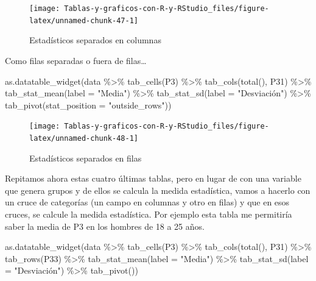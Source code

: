 \documentclass[
]{book}
\newenvironment{Shaded}{\begin{snugshade}}{\end{snugshade}}
\newcommand{\AttributeTok}[1]{\textcolor[rgb]{0.77,0.63,0.00}{#1}}
\newcommand{\FunctionTok}[1]{\textcolor[rgb]{0.00,0.00,0.00}{#1}}
\newcommand{\NormalTok}[1]{#1}
\newcommand{\SpecialCharTok}[1]{\textcolor[rgb]{0.00,0.00,0.00}{#1}}
\newcommand{\StringTok}[1]{\textcolor[rgb]{0.31,0.60,0.02}{#1}}
\begin{document}
\begin{figure}[H]

{\centering \texttt{[image: Tablas-y-graficos-con-R-y-RStudio\_files/figure-latex/unnamed-chunk-47-1]} 

}

\caption{Estadísticos separados en columnas}\label{fig:unnamed-chunk-47}
\end{figure}

Como filas separadas o fuera de filas\ldots{}

\begin{Shaded}
\begin{Highlighting}[]
\FunctionTok{as.datatable\_widget}\NormalTok{(data }\SpecialCharTok{\%\textgreater{}\%}
  \FunctionTok{tab\_cells}\NormalTok{(P3) }\SpecialCharTok{\%\textgreater{}\%}
  \FunctionTok{tab\_cols}\NormalTok{(}\FunctionTok{total}\NormalTok{(), P31) }\SpecialCharTok{\%\textgreater{}\%}
  \FunctionTok{tab\_stat\_mean}\NormalTok{(}\AttributeTok{label =} \StringTok{"Media"}\NormalTok{) }\SpecialCharTok{\%\textgreater{}\%}
  \FunctionTok{tab\_stat\_sd}\NormalTok{(}\AttributeTok{label =} \StringTok{"Desviación"}\NormalTok{) }\SpecialCharTok{\%\textgreater{}\%}
  \FunctionTok{tab\_pivot}\NormalTok{(}\AttributeTok{stat\_position =} \StringTok{"outside\_rows"}\NormalTok{))}
\end{Highlighting}
\end{Shaded}

\begin{figure}[H]

{\centering \texttt{[image: Tablas-y-graficos-con-R-y-RStudio\_files/figure-latex/unnamed-chunk-48-1]} 

}

\caption{Estadísticos separados en filas}\label{fig:unnamed-chunk-48}
\end{figure}

Repitamos ahora estas cuatro últimas tablas, pero en lugar de con una variable que genera grupos y de ellos se calcula la medida estadística, vamos a hacerlo con un cruce de categorías (un campo en columnas y otro en filas) y que en esos cruces, se calcule la medida estadística. Por ejemplo esta tabla me permitiría saber la media de P3 en los hombres de 18 a 25 años.

\begin{Shaded}
\begin{Highlighting}[]
\FunctionTok{as.datatable\_widget}\NormalTok{(data }\SpecialCharTok{\%\textgreater{}\%}
  \FunctionTok{tab\_cells}\NormalTok{(P3) }\SpecialCharTok{\%\textgreater{}\%}
  \FunctionTok{tab\_cols}\NormalTok{(}\FunctionTok{total}\NormalTok{(), P31) }\SpecialCharTok{\%\textgreater{}\%}
  \FunctionTok{tab\_rows}\NormalTok{(P33) }\SpecialCharTok{\%\textgreater{}\%}
  \FunctionTok{tab\_stat\_mean}\NormalTok{(}\AttributeTok{label =} \StringTok{"Media"}\NormalTok{) }\SpecialCharTok{\%\textgreater{}\%}
  \FunctionTok{tab\_stat\_sd}\NormalTok{(}\AttributeTok{label =} \StringTok{"Desviación"}\NormalTok{) }\SpecialCharTok{\%\textgreater{}\%}
  \FunctionTok{tab\_pivot}\NormalTok{())}
\end{Highlighting}
\end{Shaded}
\end{document}
